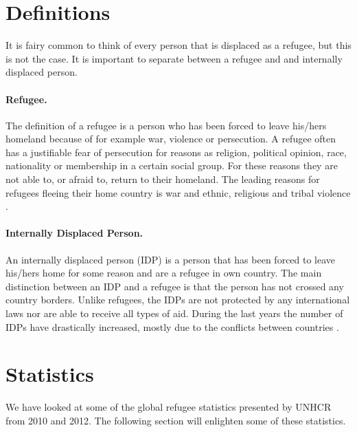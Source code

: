 
\section{Definitions}
It is fairy common to think of every person that is displaced as a refugee, but this is not the case. It is important to separate between a refugee and and internally displaced person. 

\paragraph{Refugee.} The definition of a refugee is a person who has been forced to leave his/hers homeland because of for example war, violence or persecution. A refugee often has a justifiable fear of persecution for reasons as religion, political opinion, race, nationality or membership in a certain social group. For these reasons they are not able to, or
afraid to, return to their homeland. The leading reasons for refugees fleeing their home country is war and ethnic, religious and tribal violence \cite{refugeeDef}.

\paragraph{Internally Displaced Person.} An internally displaced person (IDP) is a person that has been forced to leave his/hers home for some reason and are a refugee in own country. The main distinction between an IDP and a refugee is that the person has not crossed any country borders. Unlike refugees, the IDPs are not protected by any international laws nor are able to receive all types of aid. During the last years the number of IDPs have drastically increased, mostly due to the conflicts between countries \cite{refugeeDef}. 


\section{Statistics}
We have looked at some of the global refugee statistics presented by UNHCR from 2010 and 2012. The following section will enlighten some of these statistics. 

